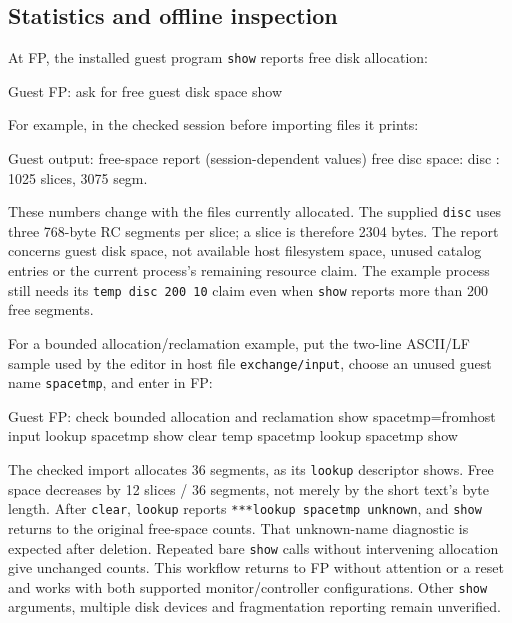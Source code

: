 \subsection{Statistics and offline inspection}\label{statistics-and-offline-inspection}

At FP, the installed guest program \passthrough{\lstinline!show!} reports free disk allocation:

\begin{commandexample}{Guest FP: ask for free guest disk space}
show
\end{commandexample}

For example, in the checked session before importing files it prints:

\begin{commandexample}{Guest output: free-space report (session-dependent values)}
free disc space:
disc        :  1025 slices,   3075 segm.
\end{commandexample}

These numbers change with the files currently allocated. The supplied \passthrough{\lstinline!disc!} uses three 768-byte RC segments per slice; a slice is therefore 2304 bytes. The report concerns guest disk space, not available host filesystem space, unused catalog entries or the current process's remaining resource claim. The example process still needs its \passthrough{\lstinline!temp disc 200 10!} claim even when \passthrough{\lstinline!show!} reports more than 200 free segments.

For a bounded allocation/reclamation example, put the two-line ASCII/LF sample used by the editor in host file \passthrough{\lstinline!exchange/input!}, choose an unused guest name \passthrough{\lstinline!spacetmp!}, and enter in FP:

\begin{commandexample}{Guest FP: check bounded allocation and reclamation}
show
spacetmp=fromhost input
lookup spacetmp
show
clear temp spacetmp
lookup spacetmp
show
\end{commandexample}

The checked import allocates 36 segments, as its \passthrough{\lstinline!lookup!} descriptor shows. Free space decreases by 12 slices / 36 segments, not merely by the short text's byte length. After \passthrough{\lstinline!clear!}, \passthrough{\lstinline!lookup!} reports \passthrough{\lstinline!***lookup spacetmp unknown!}, and \passthrough{\lstinline!show!} returns to the original free-space counts. That unknown-name diagnostic is expected after deletion. Repeated bare \passthrough{\lstinline!show!} calls without intervening allocation give unchanged counts. This workflow returns to FP without attention or a reset and works with both supported monitor/controller configurations. Other \passthrough{\lstinline!show!} arguments, multiple disk devices and fragmentation reporting remain unverified.

